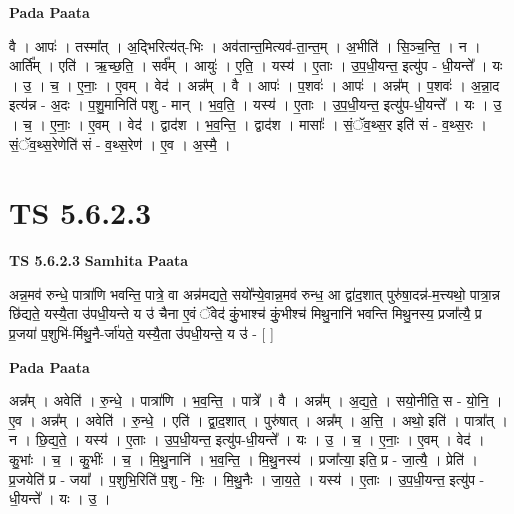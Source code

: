 \documentclass[17pt]{extarticle}
\begin{document}
\textbf{Pada Paata} \newline

वै । आपः॑ । तस्मा᳚त् । अ॒द्भिरित्य॑त्-भिः । अव॑तान्त॒मित्यव॑-ता॒न्त॒म् । अ॒भीति॑ । सि॒ञ्च॒न्ति॒ । न । आर्ति᳚म् । एति॑ । ऋ॒च्छ॒ति॒ । सर्व᳚म् । आयुः॑ । ए॒ति॒ । यस्य॑ । ए॒ताः । उ॒प॒धी॒यन्त॒ इत्यु॑प - धी॒यन्ते᳚ । यः । उ॒ । च॒ । ए॒नाः॒ । ए॒वम् । वेद॑ । अन्न᳚म् । वै । आपः॑ । प॒शवः॑ । आपः॑ । अन्न᳚म् । प॒शवः॑ । अ॒न्ना॒द इत्य॑न्न - अ॒दः । प॒शु॒मानिति॑ पशु - मान् । भ॒व॒ति॒ । यस्य॑ । ए॒ताः । उ॒प॒धी॒यन्त॒ इत्यु॑प-धी॒यन्ते᳚ । यः । उ॒ । च॒ । ए॒नाः॒ । ए॒वम् । वेद॑ । द्वाद॑श । भ॒व॒न्ति॒ । द्वाद॑श । मासाः᳚ । सं॒ॅव॒थ्स॒र इति॑ सं - व॒थ्स॒रः । सं॒ॅव॒थ्स॒रेणेति॑ सं - व॒थ्स॒रेण॑ । ए॒व । अ॒स्मै॒ ।  \newline




\section*{ TS 5.6.2.3 }

\textbf{TS 5.6.2.3 } \newline
\textbf{Samhita Paata} \newline

अन्न॒मव॑ रुन्धे॒ पात्रा॑णि भवन्ति॒ पात्रे॒ वा अन्न॑मद्यते॒ सयो᳚न्ये॒वान्न॒मव॑ रुन्ध॒ आ द्वा॑द॒शात् पुरु॑षा॒दन्न॑-म॒त्त्यथो॒ पात्रा॒न्न छि॑द्यते॒ यस्यै॒ता उ॑पधी॒यन्ते य उ॑ चैना ए॒वं ॅवेद॑ कुं॒भाश्च॑ कुं॒भीश्च॑ मिथु॒नानि॑ भवन्ति मिथु॒नस्य॒ प्रजा᳚त्यै॒ प्र प्र॒जया॑ प॒शुभि॑-र्मिथु॒नै-र्जा॑यते॒ यस्यै॒ता उ॑पधी॒यन्ते॒ य उ॑ - [  ] \newline

\textbf{Pada Paata} \newline

अन्न᳚म् । अवेति॑ । रु॒न्धे॒ । पात्रा॑णि । भ॒व॒न्ति॒ । पात्रे᳚ । वै । अन्न᳚म् । अ॒द्य॒ते॒ । सयो॒नीति॒ स - यो॒नि॒ । ए॒व । अन्न᳚म् । अवेति॑ । रु॒न्धे॒ । एति॑ । द्वा॒द॒शात् । पुरु॑षात् । अन्न᳚म् । अ॒त्ति॒ । अथो॒ इति॑ । पात्रा᳚त् । न । छि॒द्य॒ते॒ । यस्य॑ । ए॒ताः । उ॒प॒धी॒यन्त॒ इत्यु॑प-धी॒यन्ते᳚ । यः । उ॒ । च॒ । ए॒नाः॒ । ए॒वम् । वेद॑ । कु॒भांः । च॒ । कु॒भींः । च॒ । मि॒थु॒नानि॑ । भ॒व॒न्ति॒ । मि॒थु॒नस्य॑ । प्रजा᳚त्या॒ इति॒ प्र - जा॒त्यै॒ । प्रेति॑ । प्र॒जयेति॑ प्र - जया᳚ । प॒शुभि॒रिति॑ प॒शु - भिः॒ । मि॒थु॒नैः । जा॒य॒ते॒ । यस्य॑ । ए॒ताः । उ॒प॒धी॒यन्त॒ इत्यु॑प - धी॒यन्ते᳚ । यः । उ॒ ।  \newline




\end{document}
